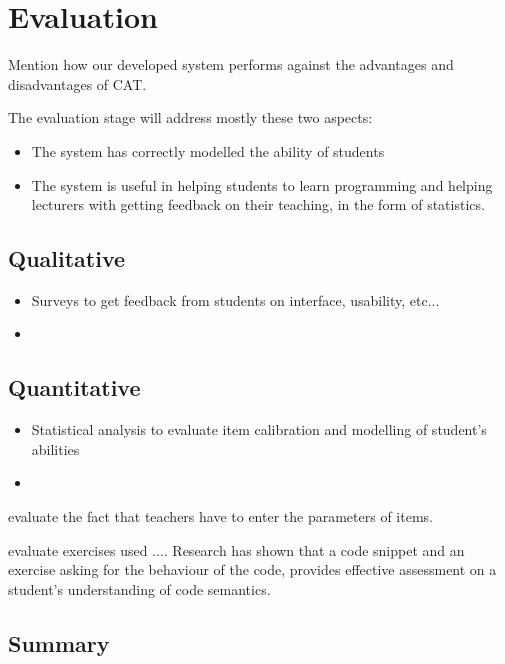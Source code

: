 \chapter{Evaluation}
Mention how our developed system performs against the advantages and disadvantages of CAT.

The evaluation stage will address mostly these two aspects:
\begin{itemize}
\item The system has correctly modelled the ability of students
\item The system is useful in helping students to learn programming and helping lecturers with getting feedback on their teaching, in the form of statistics.
\end{itemize}

\section{Qualitative}
\begin{itemize}
\item Surveys to get feedback from students on interface, usability, etc...
\item 
\end{itemize}

\section{Quantitative}
\begin{itemize}
\item Statistical analysis to evaluate item calibration and modelling of student's abilities
\item 
\end{itemize}

evaluate the fact that teachers have to enter the parameters of items.

evaluate exercises used .... Research\cite{Lister} has shown that a code snippet and an exercise asking for the behaviour of the code, provides effective assessment on a student's understanding of code semantics.

\section{Summary}